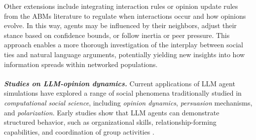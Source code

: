 \documentclass[11pt]{article}
\begin{document}
Other extensions include integrating interaction rules or opinion update rules from the ABMs literature to regulate when interactions occur and how opinions evolve. In this way, agents may be influenced by their neighbors, adjust their stance based on confidence bounds, or follow inertia or peer pressure. 
This approach enables a more thorough investigation of the interplay between social ties and natural language arguments, potentially yielding new insights into how information spreads within networked populations.
\\ \ \\
\textbf{\textit{Studies on LLM-opinion dynamics.}}
Current applications of LLM agent simulations have explored a range of social phenomena traditionally studied in \textit{computational social science}, including \textit{opinion dynamics}, \textit{persuasion} mechanisms, and \textit{polarization}. 
Early studies show that LLM agents can demonstrate structured behavior, such as organizational skills, relationship-forming capabilities, and coordination of group activities \cite{park2023generative, park2022social}.
\end{document}
